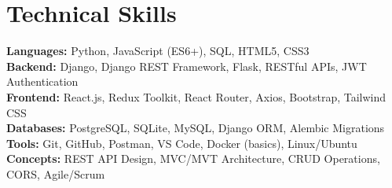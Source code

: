 \documentclass[letterpaper,11pt]{article}
\begin{document}
\section{Technical Skills}
 \begin{itemize}[leftmargin=0.15in, label={}]
    \small{\item{
     \textbf{Languages:}\hspace{4pt} Python, JavaScript (ES6+), SQL, HTML5, CSS3 \\[3pt]
     \textbf{Backend:}\hspace{8pt} Django, Django REST Framework, Flask, RESTful APIs, JWT Authentication \\[3pt]
     \textbf{Frontend:}\hspace{6pt} React.js, Redux Toolkit, React Router, Axios, Bootstrap, Tailwind CSS \\[3pt]
     \textbf{Databases:}\hspace{3pt} PostgreSQL, SQLite, MySQL, Django ORM, Alembic Migrations \\[3pt]
     \textbf{Tools:}\hspace{16pt} Git, GitHub, Postman, VS Code, Docker (basics), Linux/Ubuntu \\[3pt]
     \textbf{Concepts:}\hspace{5pt} REST API Design, MVC/MVT Architecture, CRUD Operations, CORS, Agile/Scrum
    }}
 \end{itemize}
\end{document}
